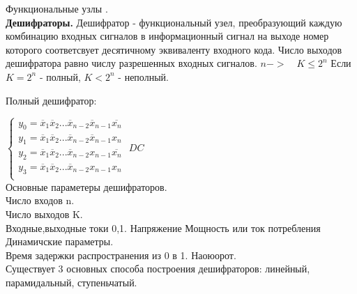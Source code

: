 Функциональные узлы .\\
\textbf{Дешифраторы.}
Дешифратор - функциональный узел, преобразующий каждую комбинацию входных сигналов в информационный
сигнал на выходе номер которого соответсвует десятичному эквиваленту входного кода.
Число выходов дешифратора равно числу разрешенных входных сигналов. $ n -> \quad K \leq 2^n$ Если  $K = 2^n$ - полный,  $K < 2^n$ - неполный.

Полный дешифратор:

$\begin{cases}
  y_0 = \overline{x}_1 \overline{x}_2 ... \overline{x}_{n-2} \overline{x}_{n-1} \overline{x_n} \\
  y_1 = \overline{x}_1 \overline{x}_2 ... \overline{x}_{n-2} \overline{x}_{n-1} {x_n}\\
  y_2=  \overline{x}_1 \overline{x}_2 ... \overline{x}_{n-2} x_{n-1} \overline{x_n}\\
  y_3=  \overline{x}_1 \overline{x}_2 ... \overline{x}_{n-2} x_{n-1} {x_n} \\

\end{cases}$
$DC $\\
Основные параметеры дешифраторов.\\
Число входов n.\\
Число выходов K.\\
Входные,выходные токи 0,1.
Напряжение
Мощность или ток потребления \\

Динамичские параметры.\\
Время задержки распространения из 0 в 1. Наоюорот.\\

Существует 3 основных способа построения дешифраторов: линейный, парамидальный, ступеньчатый.



